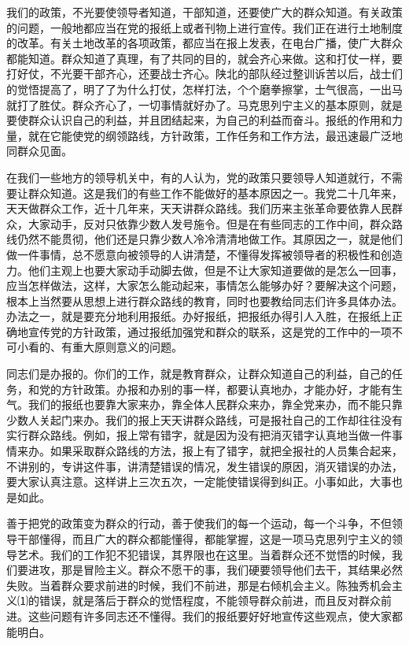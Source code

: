 \documentclass[UTF-8, a5paper, 12pt]{ctexart}
\begin{document}
我们的政策，不光要使领导者知道，干部知道，还要使广大的群众知道。有关政策的问题，一般地都应当在党的报纸上或者刊物上进行宣传。我们正在进行土地制度的改革。有关土地改革的各项政策，都应当在报上发表，在电台广播，使广大群众都能知道。群众知道了真理，有了共同的目的，就会齐心来做。这和打仗一样，要打好仗，不光要干部齐心，还要战士齐心。陕北的部队经过整训诉苦以后，战士们的觉悟提高了，明了了为什么打仗，怎样打法，个个磨拳擦掌，士气很高，一出马就打了胜仗。群众齐心了，一切事情就好办了。马克思列宁主义的基本原则，就是要使群众认识自己的利益，并且团结起来，为自己的利益而奋斗。报纸的作用和力量，就在它能使党的纲领路线，方针政策，工作任务和工作方法，最迅速最广泛地同群众见面。

在我们一些地方的领导机关中，有的人认为，党的政策只要领导人知道就行，不需要让群众知道。这是我们的有些工作不能做好的基本原因之一。我党二十几年来，天天做群众工作，近十几年来，天天讲群众路线。我们历来主张革命要依靠人民群众，大家动手，反对只依靠少数人发号施令。但是在有些同志的工作中间，群众路线仍然不能贯彻，他们还是只靠少数人冷冷清清地做工作。其原因之一，就是他们做一件事情，总不愿意向被领导的人讲清楚，不懂得发挥被领导者的积极性和创造力。他们主观上也要大家动手动脚去做，但是不让大家知道要做的是怎么一回事，应当怎样做法，这样，大家怎么能动起来，事情怎么能够办好？要解决这个问题，根本上当然要从思想上进行群众路线的教育，同时也要教给同志们许多具体办法。办法之一，就是要充分地利用报纸。办好报纸，把报纸办得引人入胜，在报纸上正确地宣传党的方针政策，通过报纸加强党和群众的联系，这是党的工作中的一项不可小看的、有重大原则意义的问题。

同志们是办报的。你们的工作，就是教育群众，让群众知道自己的利益，自己的任务，和党的方针政策。办报和办别的事一样，都要认真地办，才能办好，才能有生气。我们的报纸也要靠大家来办，靠全体人民群众来办，靠全党来办，而不能只靠少数人关起门来办。我们的报上天天讲群众路线，可是报社自己的工作却往往没有实行群众路线。例如，报上常有错字，就是因为没有把消灭错字认真地当做一件事情来办。如果采取群众路线的方法，报上有了错字，就把全报社的人员集合起来，不讲别的，专讲这件事，讲清楚错误的情况，发生错误的原因，消灭错误的办法，要大家认真注意。这样讲上三次五次，一定能使错误得到纠正。小事如此，大事也是如此。

善于把党的政策变为群众的行动，善于使我们的每一个运动，每一个斗争，不但领导干部懂得，而且广大的群众都能懂得，都能掌握，这是一项马克思列宁主义的领导艺术。我们的工作犯不犯错误，其界限也在这里。当着群众还不觉悟的时候，我们要进攻，那是冒险主义。群众不愿干的事，我们硬要领导他们去干，其结果必然失败。当着群众要求前进的时候，我们不前进，那是右倾机会主义。陈独秀机会主义⑴的错误，就是落后于群众的觉悟程度，不能领导群众前进，而且反对群众前进。这些问题有许多同志还不懂得。我们的报纸要好好地宣传这些观点，使大家都能明白。
\end{document}
